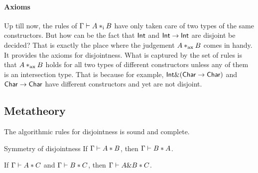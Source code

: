 \paragraph{Axioms} Up till now, the rules of $ \Gamma \vdash A *_\textnormal{i} B $ have only
taken care of two types of the same constructors. But how can be the fact that
$\textsf{Int}$ and $\textsf{Int} \to \textsf{Int}$ are disjoint be decided? That is exactly the
place where the judgement $ A *_\textnormal{ax} B $ comes in handy. It provides the
axioms for disjointness. What is captured by the set of rules is that $ A
*_\textnormal{ax} B $ holds for all two types of different constructors unless any of
them is an intersection type. That is because for example, $ \textsf{Int} \&
(\textsf{Char} \to \textsf{Char}) $ and $ \textsf{Char} \to \textsf{Char} $ have different constructors
and yet are not disjoint. 

\begin{figure*}[h]


  \caption{Algorithmic Disjointness.}
  \label{fig:disjointness}
\end{figure*}

\subsection{Metatheory}

The algorithmic rules for disjointness is sound and complete.

\begin{lemma}{Symmetry of disjointness} \label{lemma:symmetry-of-disjointness}
  If $\Gamma \vdash A * B$, then $\Gamma \vdash B * A$.
\end{lemma}

\begin{theorem} \label{lemma:disjoint-intersect}
  If $\Gamma \vdash A * C$ and $\Gamma \vdash B * C$,
  then $\Gamma \vdash A \& B * C$.
\end{theorem}

